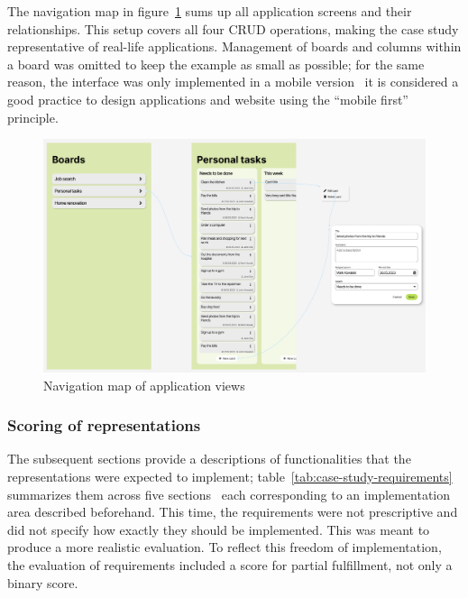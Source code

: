 The navigation map in figure~\ref{fig:3-4-navigation-map} sums up all application screens and their relationships.
This setup covers all four CRUD operations, making the case study representative of real-life applications.
Management of boards and columns within a board was omitted to keep the example as small as possible;
for the same reason, the interface was only implemented in a mobile version \textendash\ it is considered a good practice to design applications and website using the \enquote{mobile first} principle.

\begin{figure}
    \centering
    \includegraphics[width=\textwidth]{3-research-methodology/nav-map}
    \caption{Navigation map of application views}
    \label{fig:3-4-navigation-map}
\end{figure}

\subsubsection{Scoring of representations}

The subsequent sections provide a descriptions of functionalities that the representations were expected to implement;
table~\ref{tab:case-study-requirements} summarizes them across five sections \textendash\ each corresponding to an implementation area described beforehand.
This time, the requirements were not prescriptive and did not specify how exactly they should be implemented.
This was meant to produce a more realistic evaluation.
To reflect this freedom of implementation, the evaluation of requirements included a score for partial fulfillment, not only a binary score.

